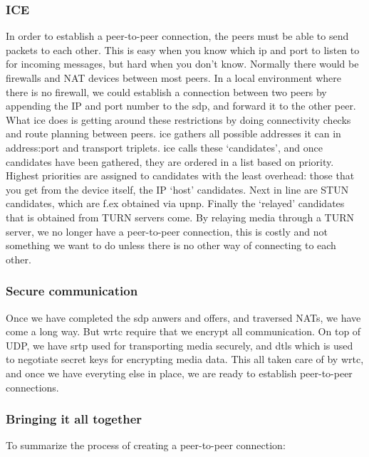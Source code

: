 \subsubsection{ICE}
In order to establish a peer-to-peer connection, the peers must be able to send packets to each other. This is easy when you know which ip and port to listen to for incoming messages, but hard when you don't know. Normally there would be firewalls and NAT devices between most peers. In a local environment where there is no firewall, we could establish a connection between two peers by appending the IP and port number to the \gls{sdp}, and forward it to the other peer. What \gls{ice} does is getting around these restrictions by doing connectivity checks and route planning between peers. \gls{ice} gathers all possible addresses it can in address:port and transport triplets\cite{ivov_ice_2013}. \gls{ice} calls these `candidates', and once candidates have been gathered, they are ordered in a list based on priority. Highest priorities are assigned to candidates with the least overhead: those that you get from the device itself, the IP `host' candidates. Next in line are STUN candidates, which are f.ex obtained via \gls{upnp}. Finally the `relayed' candidates that is obtained from TURN servers come. By relaying media through a TURN server, we no longer have a peer-to-peer connection, this is costly and not something we want to do unless there is no other way of connecting to each other.

\subsubsection{Secure communication}
Once we have completed the \gls{sdp} anwers and offers, and traversed NATs, we have come a long way. But \gls{wrtc} require that we encrypt all communication. On top of UDP, we have \gls{srtp} used for transporting media securely, and \gls{dtls} which is used to negotiate secret keys for encrypting media data. This all taken care of by \gls{wrtc}, and once we have everyting else in place, we are ready to establish peer-to-peer connections.

\subsubsection{Bringing it all together}
To summarize the process of creating a peer-to-peer connection:


